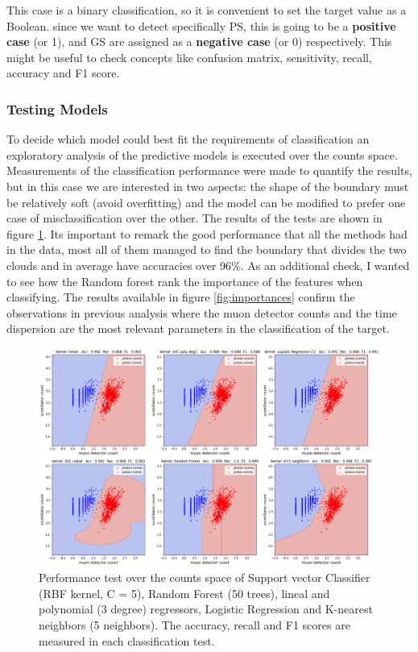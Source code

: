 \documentclass{article}
\begin{document}
This case is a binary classification, so it is convenient to set the target value as a Boolean. since we want to detect specifically PS, this is going to be a  \textbf{positive case} (or 1), and GS are assigned as a \textbf{negative case} (or 0) respectively. This might be useful to check concepts like confusion matrix, sensitivity, recall, accuracy and F1 score.  



\subsubsection{Testing Models}

To decide which model could best fit the requirements of classification an exploratory analysis of the predictive models is executed over the counts space. Measurements of the classification performance were made to quantify the results, but in this case we are interested in two aspects: the shape of the boundary must be relatively soft (avoid overfitting) and the model can be modified to prefer one case of misclassification over the other.  The results of the tests are shown in figure \ref{fig:modeltest}. Its important to remark the good performance that all the methods had in the data, most all of them managed to find the boundary that divides the two clouds and in average have accuracies over 96\%. As an additional check, I wanted to see how the Random forest rank the importance of the features when classifying. The results available in figure \ref{fig:importances} confirm the observations in previous analysis where the muon detector counts and the time dispersion are the most relevant parameters in the classification of the target.  
\begin{figure}[!h]
    \centering
    \includegraphics[width=\textwidth]{imgs/modeltest.png}
    \caption{Performance test over the counts space of Support vector Classifier (RBF kernel, C = 5), Random Forest (50 trees), lineal and polynomial (3 degree) regressors, Logistic Regression and K-nearest neighbors (5 neighbors). The accuracy, recall and F1 scores are measured in each classification test. }
    \label{fig:modeltest}
\end{figure}
\end{document}
